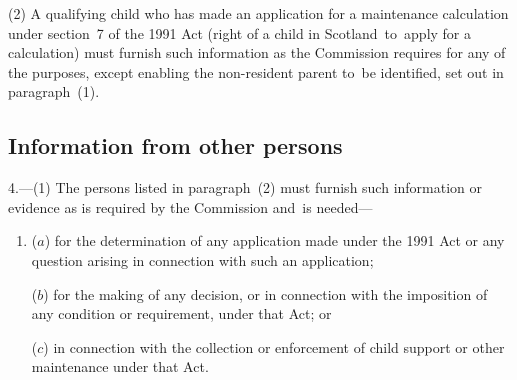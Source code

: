 \documentclass[12pt,a4paper]{article}
\begin{document}
(2) A qualifying child who has made an application for a maintenance calculation under section~7 of the 1991 Act (right of a child in Scotland~to~apply for a calculation) must furnish such information as the Commission requires for any of the purposes, except enabling the non-resident parent to~be identified, set out in paragraph~(1).

\subsection[4. Information from other persons]{Information from other persons}

4.---(1)  The persons listed in paragraph~(2) must furnish such information or evidence as is required by the Commission and~is needed—
\begin{enumerate}\item[]
($a$) for the determination of any application made under the 1991 Act or any question arising in connection with such an application;

($b$) for the making of any decision, or in connection with the imposition of any condition or requirement, under that Act; or

($c$) in connection with the collection or enforcement of child support or other maintenance under that Act.
\end{enumerate}
\end{document}
